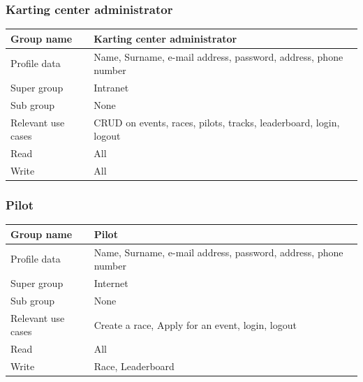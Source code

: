 \documentclass{beamer}
\begin{document}
\begin{frame}
\frametitle{Karting center administrator}

\begin{table}
    \tiny
    \begin{tabular}{|p{2cm}|p{6cm}|}
    \hline
    Group name & \textbf{Karting center administrator} \\
    \hline
    Profile data & Name, Surname, e-mail address, password, address, phone number \\
    \hline
    Super group & Intranet \\
    \hline
    Sub group & None \\
    \hline
    Relevant use cases & CRUD on events, races, pilots, tracks, leaderboard, 
    login, logout \\
    \hline
    Read & All \\
    \hline
    Write & All \\
    \hline
    \end{tabular}
    \end{table}

\end{frame}

\begin{frame}
\frametitle{Pilot}

\begin{table}
    \tiny
    \begin{tabular}{|p{2cm}|p{6cm}|}
    \hline
    Group name & \textbf{Pilot} \\
    \hline
    Profile data & Name, Surname, e-mail address, password, address, phone number \\
    \hline
    Super group & Internet \\
    \hline
    Sub group & None \\
    \hline
    Relevant use cases & Create a race, Apply for an event, 
    login, logout \\
    \hline
    Read & All \\
    \hline
    Write & Race, Leaderboard \\
    \hline
    \end{tabular}
    \end{table}

\end{frame}
\end{document}
